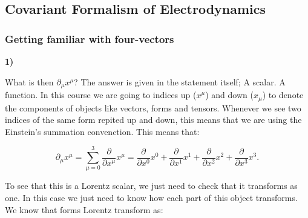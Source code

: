 \subsection{Covariant Formalism of Electrodynamics}

\newcommand{\Fu}[1]{F^{#1 }}
\newcommand{\Fd}[1]{F_{#1 }}
\newcommand{\Tu}[1]{T^{#1 }}
\newcommand{\Td}[1]{T_{#1 }}
\newcommand{\gd}[1]{g_{#1 }}
\newcommand{\gu}[1]{g^{#1 }}
\newcommand{\m}{\mu}
\newcommand{\n}{\nu}
\newcommand{\la}{\lambda}
\newcommand{\rr}{\rho}
\newcommand{\sg}{\sigma}
\newcommand{\ve}{\vec{E}}
\newcommand{\vb}{\vec{B}}
\newcommand{\pmu}{\partial_{\mu}}
\newcommand{\gm}{\gamma}
\newcommand{\bt}{\beta}
\newcommand{\Ju}[1]{J^{#1 }}
\newcommand{\Jd}[1]{J_{#1 }}
\newcommand{\Uu}[1]{U^{#1 }}
\newcommand{\Ud}[1]{U_{#1 }}
\newcommand{\Eperp}{E_{\perp}}
\newcommand{\Bperp}{B_{\perp}}
\newcommand{\Epar}{E_{\parallel}}
\newcommand{\Bpar}{B_{\parallel}}

\subsubsection{Getting familiar with four-vectors}\label{Getting Familiar with Four-Vectors}

\textbf{1)}

What is then $\partial_{\m} x^{\m}$? The answer is given in the statement itself; A scalar. A function. In this course we are going to indices up ($x^{\m}$) and down ($x_{\m}$) to denote the components of objects like vectors, forms and tensors. Whenever we see two indices of the same form repited up and down, this means that we are using the Einstein's summation convenction. This means that:

\begin{equation}\label{scalarlorentz}
	\pmu x^{\m} = \sum_{\m=0}^{3} \frac{\partial}{\partial x^{\m}} x^{\m} = \frac{\partial}{\partial x^{0}} x^{0} + \frac{\partial}{\partial x^{1}} x^{1} +\frac{\partial}{\partial x^{2}} x^{2} + \frac{\partial}{\partial x^{3}} x^{3}.
\end{equation}

To see that this is a Lorentz scalar, we just need to check that it transforms as one. In this case we just need to know how each part of this object transforms. We know that forms Lorentz transform as:

